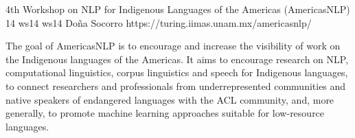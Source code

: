 \begin{wsschedulenolist}
{4th Workshop on NLP for Indigenous Languages of the Americas (AmericasNLP)}
{14}
{ws14}
{ws14}
{Do\~na Socorro}
{https://turing.iimas.unam.mx/americasnlp/}

The goal of AmericasNLP is to encourage and increase the visibility of work on the Indigenous languages of the Americas. It aims to encourage research on NLP, computational linguistics, corpus linguistics and speech for Indigenous languages, to connect researchers and professionals from underrepresented communities and native speakers of endangered languages with the ACL community, and, more generally, to promote machine learning approaches suitable for low-resource languages.

\end{wsschedulenolist}
